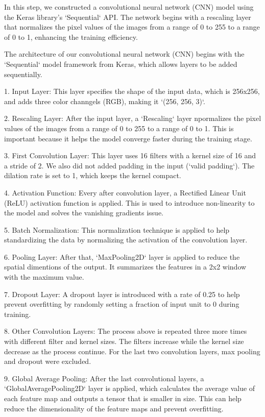 In this step, we constructed a convolutional neural network (CNN) model using the Keras library's `Sequential` API. The network begins with a rescaling layer that normalizes the pixel values of the images from a range of 0 to 255 to a range of 0 to 1, enhancing the training efficiency. 

The architecture of our convolutional neural network (CNN) begins with the `Sequential` model framework from Keras, which allows layers to be added sequentially. 

1. Input Layer: This layer specifies the shape of the input data, which is 256x256, and adds three color channgels (RGB), making it `(256, 256, 3)`.

2. Rescaling Layer: After the input layer, a `Rescaling` layer npormalizes the pixel values of the images from a range of 0 to 255 to a range of 0 to 1. This is important because it helps the model converge faster during the training stage.

3. First Convolution Layer: This layer uses 16 filters with a kernel size of 16 and a stride of 2. We also did not added padding in the input (`valid padding`). The dilation rate is set to 1, which keeps the kernel compact.

4. Activation Function: Every after convolution layer, a Rectified Linear Unit (ReLU) activation function is applied. This is used to introduce non-linearity to the model and solves the vanishing gradients issue.

5. Batch Normalization: This normalization technique is applied to help standardizing the data by normalizing the activation of the convolution layer.

6. Pooling Layer: After that, `MaxPooling2D` layer is applied to reduce the spatial dimentions of the output. It summarizes the features in a 2x2 window with the maximum value.

7. Dropout Layer: A dropout layer is introduced with a rate of 0.25 to help prevent overfitting by randomly setting a fraction of input unit to 0 during training.

8. Other Convolution Layers: The process above is repeated three more times with different filter and kernel sizes. The filters increase while the kernel size decrease as the process continue. For the last two convolution layers, max pooling and dropout were excluded.

9. Global Average Pooling: After the last convolutional layers, a `GlobalAveragePooling2D` layer is applied, which calculates the average value of each feature map and outputs a tensor that is smaller in size. This can help reduce the dimensionality of the feature maps and prevent overfitting. 

